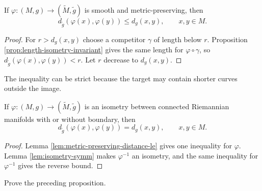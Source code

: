 \begin{lemma}
\label{lem:metric-preserving-distance-le}
\leanok
{}
If $\varphi:(M,g)\to(\widetilde M,\widetilde g)$ is smooth and metric-preserving, then
\[
d_{\widetilde g}(\varphi(x),\varphi(y))\le d_g(x,y),
\qquad x,y\in M.
\]
\end{lemma}
\begin{proof}
\leanok
{}
\sketch For $r>d_g(x,y)$ choose a competitor $\gamma$ of length below $r$. Proposition \ref{prop:length-isometry-invariant} gives the same length for $\varphi\circ\gamma$, so $d_{\widetilde g}(\varphi(x),\varphi(y))<r$. Let $r$ decrease to $d_g(x,y)$.
\end{proof}

The inequality can be strict because the target may contain shorter curves outside the image.

\begin{proposition}
\label{prop:isometry-invariance-riemannian-distance}
\leanok
{}
If $\varphi:(M,g)\to(\widetilde M,\widetilde g)$ is an isometry between connected Riemannian manifolds with or without boundary, then
\[
d_{\widetilde g}(\varphi(x),\varphi(y))=d_g(x,y),
\qquad x,y\in M.
\]
\end{proposition}
\begin{proof}
\leanok
{}
\sketch Lemma \ref{lem:metric-preserving-distance-le} gives one inequality for $\varphi$. Lemma \ref{lem:isometry-symm} makes $\varphi^{-1}$ an isometry, and the same inequality for $\varphi^{-1}$ gives the reverse bound.
\end{proof}

\begin{exercise}
\label{exer:prove-isometry-invariance}
\leanok
{}
Prove the preceding proposition.
\end{exercise}

